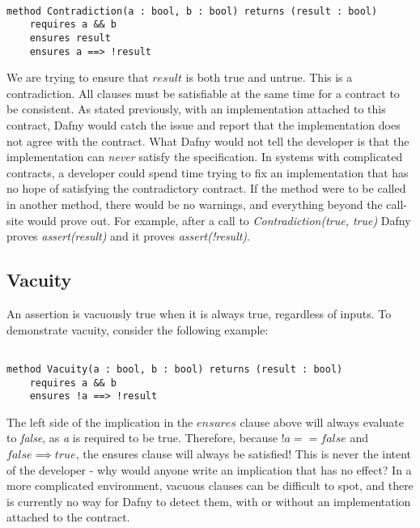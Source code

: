 \documentclass{article}
\newif\ifcomments
\newcommand{\egm}[1]{\ifcomments\textcolor{orange}{egm: #1}\fi}
\newcommand{\cass}[1]{\ifcomments\textcolor{blue}{cass: #1}\fi}
\begin{document}
\begin{lstlisting}[language=dafny]

method Contradiction(a : bool, b : bool) returns (result : bool)
    requires a && b
    ensures result
    ensures a ==> !result

\end{lstlisting}

We are trying to ensure that \(result\) is both true and untrue. This is a contradiction. All clauses must be satisfiable
at the same time for a contract to be consistent. As stated previously, with an implementation attached to this contract,
Dafny would catch the issue and report that the implementation does not agree with the contract. What Dafny would not
tell the developer is that the implementation can {\it never} satisfy the specification. In systems with complicated
contracts, a developer could spend time trying to fix an implementation that has no hope of satisfying the contradictory
contract. If the method were to be called in another method, there would be no warnings, and everything beyond the call-site 
would prove out. For example, after a call to \emph{Contradiction(true, true)} Dafny proves \emph{assert(result)} and it proves \emph{assert(!result)}. 

\egm{For example, after a call to \emph{PostconditionContradiction(true, true)} Dafny proves \emph{assert(result)} and it proves \emph{assert(!result)}. Change the method name to something shorter too so it fits on the line.} 
\cass{Done!}

\subsection{Vacuity}

An assertion is vacuously true when it is always true, regardless of inputs. To demonstrate vacuity, consider the following example:

\begin{lstlisting}[language=dafny]

method Vacuity(a : bool, b : bool) returns (result : bool)
    requires a && b
    ensures !a ==> !result

\end{lstlisting}

The left side of the implication in the \(ensures\) clause above will always evaluate to {\it false}, as {\it a} is required to be true. 
Therefore, because \(!a == false\) and \(false \implies true\), the ensures clause will always be satisfied! This is never the intent of the 
developer - why would anyone write an implication that has no effect? In a more complicated environment, vacuous clauses can be difficult to 
spot, and there is currently no way for Dafny to detect them, with or without an implementation attached to
the contract.
\end{document}

